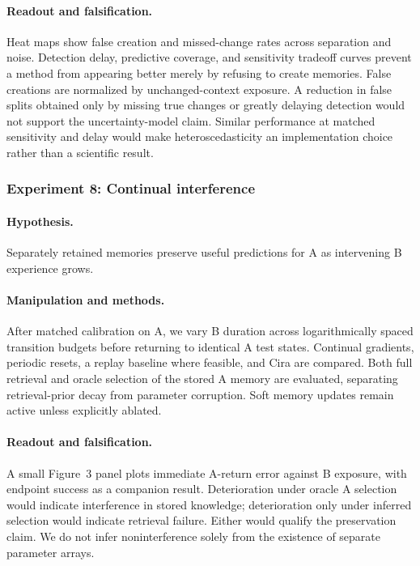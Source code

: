 \paragraph{Readout and falsification.}
Heat maps show false creation and missed-change rates across separation and noise. Detection delay, predictive coverage, and sensitivity tradeoff curves prevent a method from appearing better merely by refusing to create memories. False creations are normalized by unchanged-context exposure. A reduction in false splits obtained only by missing true changes or greatly delaying detection would not support the uncertainty-model claim. Similar performance at matched sensitivity and delay would make heteroscedasticity an implementation choice rather than a scientific result.

\subsubsection{Experiment 8: Continual interference}
\paragraph{Hypothesis.}
Separately retained memories preserve useful predictions for A as intervening B experience grows.

\paragraph{Manipulation and methods.}
After matched calibration on A, we vary B duration across logarithmically spaced transition budgets before returning to identical A test states. Continual gradients, periodic resets, a replay baseline where feasible, and Cira are compared. Both full retrieval and oracle selection of the stored A memory are evaluated, separating retrieval-prior decay from parameter corruption. Soft memory updates remain active unless explicitly ablated.

\paragraph{Readout and falsification.}
A small Figure~3 panel plots immediate A-return error against B exposure, with endpoint success as a companion result. Deterioration under oracle A selection would indicate interference in stored knowledge; deterioration only under inferred selection would indicate retrieval failure. Either would qualify the preservation claim. We do not infer noninterference solely from the existence of separate parameter arrays.

